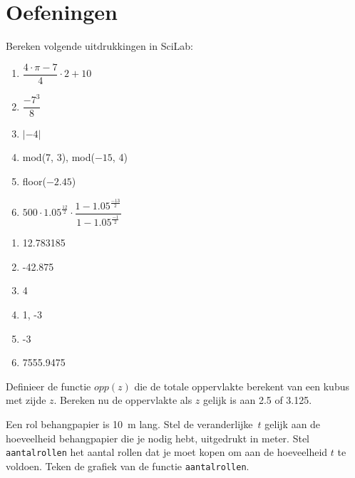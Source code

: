 \section{Oefeningen}
\begin{oef}
Bereken volgende uitdrukkingen in SciLab: 
\begin{enumerate}
  \item  $\dfrac{4\cdot \pi-7}4 \cdot 2+10$
  \item $\dfrac{ -7^3}8 $
  \item $| - 4| $
  \item mod(7, 3), mod($ -15$, 4) 
  \item floor($-2.45$) 
  \item $500\cdot 1.05^\frac{12}2\cdot \dfrac{1-1.05^\frac{-13}2}{1-1.05^\frac{-1}2} $
\end{enumerate}
\begin{opl}
\begin{enumerate}
  \item 12.783185	
  \item -42.875
  \item 4
  \item 1, -3 
  \item -3
  \item 7555.9475
\end{enumerate}
\end{opl}
\end{oef}

\begin{oef}
Definieer de functie $opp(z)$ die de totale oppervlakte berekent 
van een kubus met zijde $z$. Bereken nu de oppervlakte 
als $z$ gelijk is aan \num{2.5} of \num{3.125}.
\begin{opl}
\end{opl}
\end{oef}



\begin{oef}
Een rol behangpapier is \SI{10}{\meter} lang. Stel de veranderlijke~$t$
gelijk aan de hoeveelheid behangpapier die je nodig hebt, uitgedrukt in meter.
Stel \verb/aantalrollen/ het aantal rollen dat je moet kopen om aan de
hoeveelheid $t$ te voldoen. Teken de grafiek van de functie \verb/aantalrollen/.
\begin{opl}
\end{opl}
\end{oef}


